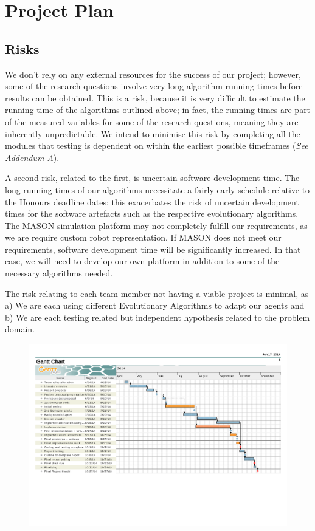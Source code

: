 \documentclass[a4paper,12pt]{article}
\begin{document}
\section{Project Plan}

\subsection{Risks}
We don’t rely on any external resources for the success of our project; however, some of the research questions involve very long algorithm running times before results can be obtained. This is a risk, because it is very difficult to estimate the running time of the algorithms outlined above; in fact, the running times are part of the measured variables for some of the research questions, meaning they are inherently unpredictable. We intend to minimise this risk by completing all the modules that testing is dependent on within the earliest possible timeframes (\textit{See Addendum A}).

A second risk, related to the first, is uncertain software development time. The long running times of our algorithms necessitate a fairly early schedule relative to the Honours deadline dates; this exacerbates the risk of uncertain development times for the software artefacts such as the respective evolutionary algorithms. The MASON simulation platform may not completely fulfill our requirements, as we are require custom robot representation. If MASON does not meet our requirements, software development time will be significantly increased. In that case, we will need to develop our own platform in addition to some of the necessary algorithms needed.

The risk relating to each team member not having a viable project is minimal, as a) We are each using different Evolutionary Algorithms to adapt our agents and b) We are each testing related but independent hypothesis related to the problem domain.



\begin{landscape}
\appendix
\begin{figure}[H]
\centering
\includegraphics[width=\linewidth]{ganttchart}
\end{figure}
\end{landscape}
\end{document}
